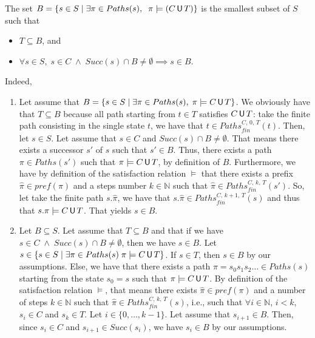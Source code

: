 \begin{proof2}
The set $B = \{ s \in S \; | \; \exists \pi \in Paths(s), \;\; \pi \models (C \,\text{\sffamily U}\, T) \}$ is the smallest subset of $S$ such that
\begin{itemize}
  \item $T \subseteq B$, and
  \item $\forall s \in S, \; s \in C \; \wedge \; Succ(s) \cap B \neq \emptyset \implies s \in B$.
\end{itemize}
Indeed,
\begin{enumerate}
  \item Let assume that $B = \{s \in S \; | \; \exists \pi \in Paths(s), \; \pi \models C\,\text{\sffamily U}\, T\}$. We obviously have that $T \subseteq B$ because all path starting from $t \in T$ satisfies $C \,\text{\sffamily U}\, T$: take the finite path consisting in the single state $t$, we have that
  $t \in Paths_{fin}^{C, \, 0,\, T}(t)$. Then, let $s \in S$. Let assume that $s \in C$ and $Succ(s) \cap B \neq \emptyset$. That means there exists a successor $s'$ of $s$ such that $s' \in B$. Thus, there exists
  a path $\pi \in Paths(s')$ such that $\pi \models C\,\text{\sffamily U}\, T$, by definition of $B$. Furthermore, we have by definition of the satisfaction relation $\models$ that there exists a prefix $\hat{\pi}\in pref(\pi)$ and a steps number $k \in \mathbb{N}$ such that $\hat{\pi} \in Paths_{fin}^{C, \, k,\, T}(s')$. So, let take the finite path $s.\hat{\pi}$, we have that $s.\hat{\pi} \in Paths^{C, \, k+1, \, T}_{fin}(s)$
  and thus that $s.\pi \models C \,\text{\sffamily U}\, T$. That yields $s \in B$.
  \item Let $B \subseteq S$. Let assume that $T \subseteq B$ and that if we have $s \in C \; \wedge \; Succ(s) \cap B \neq \emptyset$, then we have $s \in B$. Let $s \in \{s\in S \; | \; \exists \pi \in Paths(s) \; \pi \models C \,\text{\sffamily U}\, T\}$. If $s \in T$, then $s \in B$ by our assumptions.
  Else, we have that there exists a path $\pi = s_0 s_1 s_2 \dots \in Paths(s)$ starting from the state $s_0=s$ such that  $\pi \models C \,\text{\sffamily U}\, T$.
  By definition of the satisfaction relation $\models$, that means there exists
  $\hat{\pi} \in pref(\pi)$ and a number of steps $k \in \mathbb{N}$ such that $\hat{\pi} \in Paths_{fin}^{C, \, k, \, T}(s)$, i.e., such that $\forall i \in \mathbb{N}$, $i < k$, $s_i \in C$ and $s_k \in T$.
    Let $i \in \{0, \dots, k-1\}$.
    Let assume that $s_{i+1} \in B$. Then, since $s_i \in C$ and $s_{i+1} \in Succ(s_i)$, we have $s_i \in B$ by our assumptions.

\end{enumerate}
\end{proof2}

